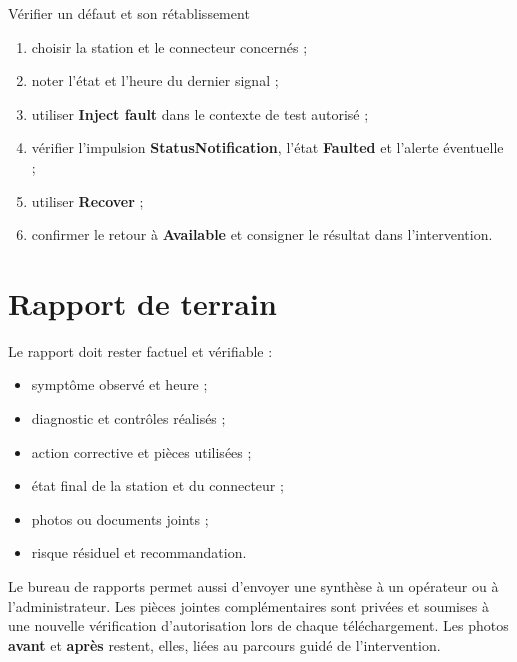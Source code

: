 \begin{procedurebox}{Vérifier un défaut et son rétablissement}
  \begin{enumerate}[leftmargin=1.6em]
    \item choisir la station et le connecteur concernés ;
    \item noter l'état et l'heure du dernier signal ;
    \item utiliser \textbf{Inject fault} dans le contexte de test autorisé ;
    \item vérifier l'impulsion \textbf{StatusNotification}, l'état
    \textbf{Faulted} et l'alerte éventuelle ;
    \item utiliser \textbf{Recover} ;
    \item confirmer le retour à \textbf{Available} et consigner le résultat dans
    l'intervention.
  \end{enumerate}
\end{procedurebox}

\section{Rapport de terrain}


Le rapport doit rester factuel et vérifiable :

\begin{itemize}[leftmargin=1.6em]
  \item symptôme observé et heure ;
  \item diagnostic et contrôles réalisés ;
  \item action corrective et pièces utilisées ;
  \item état final de la station et du connecteur ;
  \item photos ou documents joints ;
  \item risque résiduel et recommandation.
\end{itemize}

Le bureau de rapports permet aussi d'envoyer une synthèse à un opérateur ou à
l'administrateur. Les pièces jointes complémentaires sont privées et soumises à
une nouvelle vérification d'autorisation lors de chaque téléchargement. Les
photos \textbf{avant} et \textbf{après} restent, elles, liées au parcours guidé
de l'intervention.

